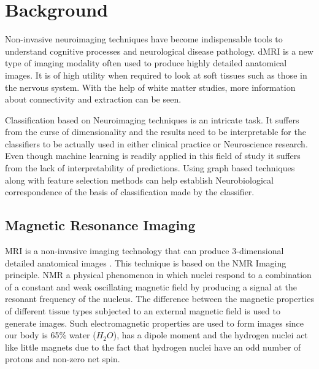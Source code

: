 \documentclass[msthesis.tex]{subfiles}
\begin{document}
\chapter{Background}
Non-invasive neuroimaging techniques have become indispensable tools to understand cognitive processes and neurological disease pathology. \gls{dMRI} is a new type of imaging modality often used to produce highly detailed anatomical images. It is of high utility when required to look at soft tissues such as those in the nervous system. With the help of white matter studies, more information about connectivity and extraction can be seen.

Classification based on Neuroimaging techniques is an intricate task. It suffers from the curse of dimensionality and the results need to be interpretable for the classifiers to be actually used in either clinical practice or Neuroscience research. Even though machine learning is readily applied in this field of study it suffers from the lack of interpretability of predictions. Using graph based techniques along with feature selection methods can help establish Neurobiological correspondence of the basis of classification made by the classifier.  

\section{Magnetic Resonance Imaging}
\gls{MRI} is a non-invasive imaging technology that can produce 3-dimensional detailed anatomical images \citep{mcrobbie_moore_graves_prince_2006}. This technique is based on the \gls{NMR} Imaging principle. \gls{NMR} a physical phenomenon in which nuclei respond to a combination of a constant and weak oscillating magnetic field by producing a signal at the resonant frequency of the nucleus. The difference between the magnetic properties of different tissue types subjected to an external magnetic field is used to generate images. Such electromagnetic properties are used to form images since our body is 65\% water ($H_2O$), has a dipole moment and the hydrogen nuclei act like little magnets due to the fact that hydrogen nuclei have an odd number of protons and non-zero net spin. 
\end{document}
